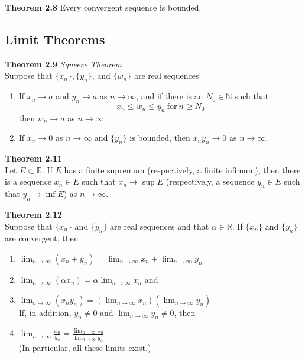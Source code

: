 \documentclass[8pt,landscape]{article}
\begin{document}
\begin{multicols}{3}
    \textbf{Theorem 2.8}
    Every convergent sequence is bounded.


    \subsection{Limit Theorems}



    \textbf{Theorem 2.9} \emph{Squeeze Theorem} \\
    Suppose that $\{x_n\}, \{y_n\}$, and $\{w_n\}$ are real sequences.
    \begin{enumerate}
        \item If $x_n \to a$ and $y_n \to a$ as $n \to \infty$,
            and if there is an $N_0 \in \mathbb{N}$ such that
            \[
                x_n \leq w_n \leq y_n \ \text{for} \ n \geq N_0
            \]
            then $w_n \to a$ as $n \to \infty$.
        \item If $x_n \to 0$ as $n \to \infty$ and $\{y_n\}$ is bounded,
            then $x_n y_n \to 0$ as $n \to \infty$.
    \end{enumerate}

    \textbf{Theorem 2.11} \\
    Let $E \subset \mathbb{R}$.
    If $E$ has a finite supremum (respectively, a finite infimum),
    then there is a sequence $x_n \in E$ such that $x_n \to \sup E$
    (respectively, a sequence $y_n \in E$ such that $y_n \to \inf E$)
    as $n \to \infty$.

    \textbf{Theorem 2.12} \\
    Suppose that $\{x_n\}$ and $\{y_n\}$ are real sequences and that
    $\alpha \in \mathbb{R}$.
    If $\{x_n\}$ and $\{y_n\}$ are convergent, then
    \begin{enumerate}
        \item $\lim_{n \to \infty} (x_n + y_n) =
            \lim_{n \to \infty} x_n + \lim_{n \to \infty} y_n$
        \item $\lim_{n \to \infty} (\alpha x_n) = \alpha \lim_{n \to \infty} x_n$
            and
        \item $\lim_{n \to \infty} (x_n y_n) =
            ( \lim_{n \to \infty} x_n ) (\lim_{n \to \infty} y_n)$ \\
            If, in addition, $y_n \neq 0$ and $\lim_{n \to \infty} y_n \neq 0$, then
        \item $\lim_{n \to \infty} \frac{x_n}{y_n} =
            \frac{\lim_{n \to \infty} x_n}{\lim_{n \to \infty} y_n}$ \\
            (In particular, all these limits exist.)
    \end{enumerate}


\end{multicols}
\end{document}
